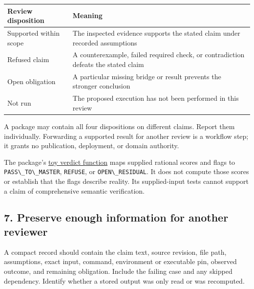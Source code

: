 \documentclass[
  11pt,
]{article}
\newcommand{\passthrough}[1]{#1}
\begin{document}
\begin{longtable}[]{@{}
  >{\raggedright\arraybackslash}p{}
  >{\raggedright\arraybackslash}p{}@{}}
\toprule\noalign{}
\begin{minipage}[b]{\linewidth}\raggedright
Review disposition
\end{minipage} & \begin{minipage}[b]{\linewidth}\raggedright
Meaning
\end{minipage} \\
\midrule\noalign{}
\endhead
\bottomrule\noalign{}
\endlastfoot
Supported within scope & The inspected evidence supports the stated
claim under recorded assumptions \\
Refused claim & A counterexample, failed required check, or
contradiction defeats the stated claim \\
Open obligation & A particular missing bridge or result prevents the
stronger conclusion \\
Not run & The proposed execution has not been performed in this
review \\
\end{longtable}

A package may contain all four dispositions on different claims. Report
them individually. Forwarding a supported result for another review is a
workflow step; it grants no publication, deployment, or domain
authority.

The package's
\href{https://github.com/dbccpage/the_symbol_game/blob/52cb5457f6c485ba548cfd292f6012a941ed22cf/omega_engine_atlas/coda_atlas/omega_engine_symbol_game/009_pfp_adversarial_dialectics_and_terminal_reality_gates/code/tests/test_009_adversarial_reality_gate.py}{toy
verdict function} maps supplied rational scores and flags to
\passthrough{\lstinline!PASS\_TO\_MASTER!},
\passthrough{\lstinline!REFUSE!}, or
\passthrough{\lstinline!OPEN\_RESIDUAL!}. It does not compute those
scores or establish that the flags describe reality. Its supplied-input
tests cannot support a claim of comprehensive semantic verification.

\subsection{7. Preserve enough information for another
reviewer}\label{preserve-enough-information-for-another-reviewer}

A compact record should contain the claim text, source revision, file
path, assumptions, exact input, command, environment or executable pin,
observed outcome, and remaining obligation. Include the failing case and
any skipped dependency. Identify whether a stored output was only read
or was recomputed.
\end{document}
